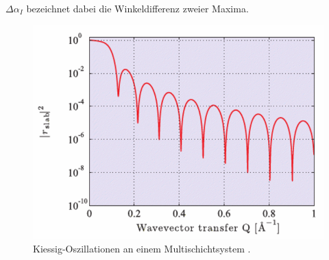 $\Delta \alpha_I$ bezeichnet dabei die Winkeldifferenz zweier Maxima.
\begin{figure}[H]
    \centering
    \includegraphics[scale=0.5]{Bilder/oszillation.png}
    \caption{Kiessig-Oszillationen an einem Multischichtsystem \cite{als-nielsen2011}.}
    \label{fig:oszillation}
\end{figure}

